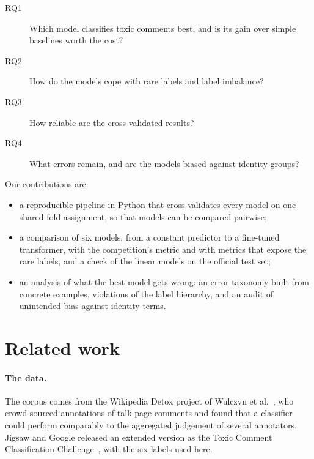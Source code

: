 \documentclass[11pt,a4paper]{article}
\begin{document}
\begin{description}
  \item[RQ1] Which model classifies toxic comments best, and is its gain over
        simple baselines worth the cost?
  \item[RQ2] How do the models cope with rare labels and label imbalance?
  \item[RQ3] How reliable are the cross-validated results?
  \item[RQ4] What errors remain, and are the models biased against identity
        groups?
\end{description}

Our contributions are:

\begin{itemize}
  \item a reproducible pipeline in Python that cross-validates every model on
        one shared fold assignment, so that models can be compared pairwise;
  \item a comparison of six models, from a constant predictor to a fine-tuned
        transformer, with the competition's metric and with metrics that
        expose the rare labels, and a check of the linear models on the
        official test set;
  \item an analysis of what the best model gets wrong: an error taxonomy built
        from concrete examples, violations of the label hierarchy, and an audit
        of unintended bias against identity terms.
\end{itemize}

\section{Related work}

\paragraph{The data.}  The corpus comes from the Wikipedia Detox project of
Wulczyn et al.~\cite{wulczyn2017}, who crowd-sourced annotations of talk-page
comments and found that a classifier could perform comparably to the
aggregated judgement of several annotators.  Jigsaw and Google released an extended version as the Toxic
Comment Classification Challenge~\cite{jigsaw2018}, with the six labels used
here.
\end{document}

